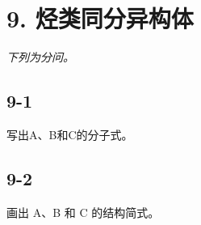 \section*{9. 烃类同分异构体}
\textit{下列为分问。}

\subsection*{9-1}
写出A、B和C的分⼦式。

\subsection*{9-2}
画出 A、B 和 C 的结构简式。
